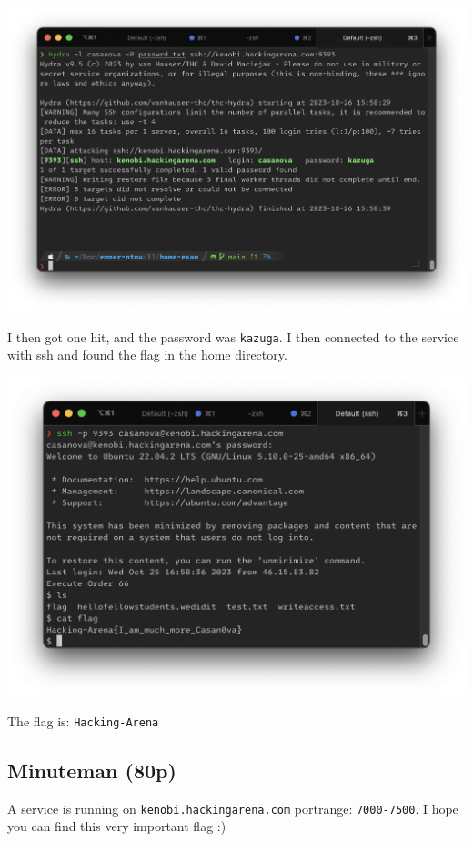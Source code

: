 \begin{center}
    \includegraphics[width=15cm]{img/Get in touch with services/Casanova/Skjermbilde 2023-10-26 kl. 15.59.05.png}
\end{center}

I then got one hit, and the password was \texttt{kazuga}. I then connected to the service with ssh and found the flag in the home directory.

\begin{center}
    \includegraphics[width=15cm]{img/Get in touch with services/Casanova/Skjermbilde 2023-10-26 kl. 15.59.48.png}
\end{center}

The flag is: \texttt{Hacking-Arena}

\subsection{Minuteman (80p)}
A service is running on \texttt{kenobi.hackingarena.com} portrange: \texttt{7000-7500}. I hope you can find this very important flag :)

